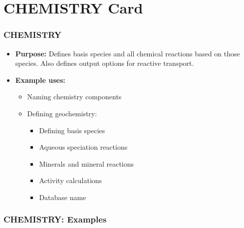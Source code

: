 \section{CHEMISTRY Card}

\begin{frame}\frametitle{CHEMISTRY}

\begin{itemize}
\item[] \textbf{Purpose:} Defines basis species and all chemical reactions based on those species.  Also defines output options for reactive transport.
\item[] \textbf{Example uses:}
\begin{itemize}
  \item Naming chemistry components
  \item Defining geochemistry:
    \begin{itemize}
      \item Defining basis species
      \item Aqueous speciation reactions
      \item Minerals and mineral reactions
      \item Activity calculations
      \item Database name
    \end{itemize}
\end{itemize}
\end{itemize}

\end{frame}

\begin{frame}[fragile]\frametitle{CHEMISTRY: Examples}

\end{frame}
